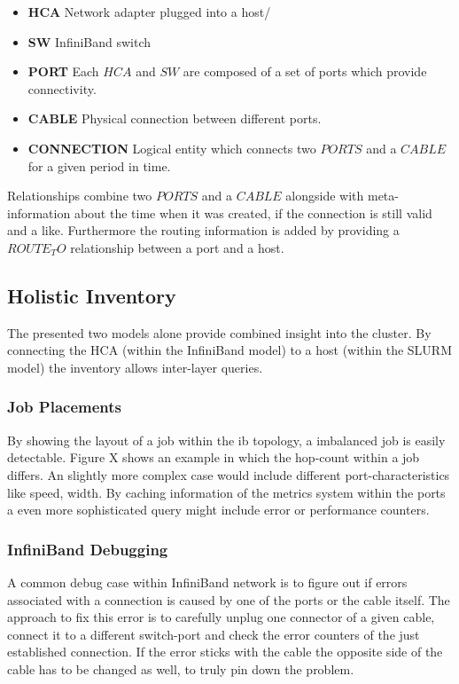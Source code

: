 \begin{itemize}
    \item \textbf{HCA} Network adapter plugged into a host/
    \item \textbf{SW} InfiniBand switch
    \item \textbf{PORT} Each $HCA$ and $SW$ are composed of a set of ports which provide connectivity.
    \item \textbf{CABLE} Physical connection between different ports.
    \item \textbf{CONNECTION} Logical entity which connects two $PORTS$ and a $CABLE$ for a given period in time.
\end{itemize}

Relationships combine two $PORTS$ and a $CABLE$ alongside with meta-information about the time when it was created, if the connection is still valid and a like.
Furthermore the routing information is added by providing a $ROUTE_TO$ relationship between a port and a host.

\subsection{Holistic Inventory}
The presented two models alone provide combined insight into the cluster. By connecting the HCA (within the InfiniBand model) to a host (within the SLURM model) the inventory allows inter-layer queries.

\subsubsection{Job Placements}
By showing the layout of a job within the \gls{ib} topology, a imbalanced job is easily detectable. Figure X shows an example in which the hop-count within a job differs.
An slightly more complex case would include different port-characteristics like speed, width.
By caching information of the metrics system within the ports a even more sophisticated query might include error or performance counters.

\subsubsection{InfiniBand Debugging}
A common debug case within InfiniBand network is to figure out if errors associated with a connection is caused by one of the ports or the cable itself.
The approach to fix this error is to carefully unplug one connector of a given cable, connect it to a different switch-port and check the error counters of the just established connection.
If the error sticks with the cable the opposite side of the cable has to be changed as well, to truly pin down the problem.

